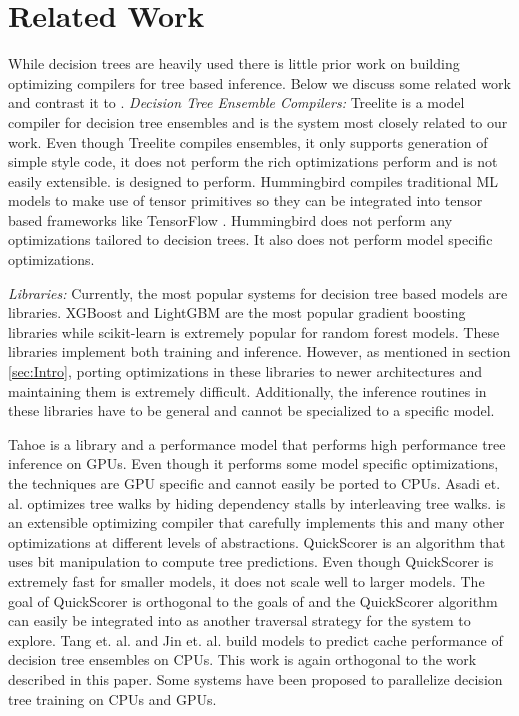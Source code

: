 \section{Related Work}
While decision trees are heavily used there is little prior work on building optimizing compilers for tree based inference. Below we discuss some related work and contrast it to \Treebeard{}.
\emph{Decision Tree Ensemble Compilers:}
Treelite\cite{Treelite} is a model compiler for decision tree ensembles and is the system
 most closely related to our work. Even though Treelite compiles ensembles, it only supports 
generation of simple  style code, it does not perform the rich 
optimizations \Treebeard{} perform and is not easily extensible.
\Treebeard{} is designed to perform. 
Hummingbird\cite{Hummingbird} compiles traditional ML models to make use 
of tensor primitives so 
they can be integrated into tensor based frameworks like TensorFlow \cite{TensorFlow}.
Hummingbird does not perform any optimizations tailored to decision trees. It 
also does not perform model specific optimizations. 

\emph{Libraries:} Currently, the most popular systems for decision tree based models 
are libraries. XGBoost\cite{XGBoost} and LightGBM\cite{LightGBM} are the most  
popular gradient boosting libraries while scikit-learn\cite{Sklearn} is 
extremely popular for random forest models. These libraries implement both 
training and inference. However, as mentioned in section \ref{sec:Intro}, porting 
optimizations in these libraries to newer architectures and maintaining them is 
extremely difficult. Additionally, the inference routines in these libraries have 
to be general and cannot be specialized to a specific model.

Tahoe\cite{Tahoe} is a library and a performance model that performs high 
performance tree inference on GPUs. Even though it performs some model 
specific optimizations, the techniques are GPU specific and cannot easily 
be ported to CPUs. Asadi et. al.\cite{VPred} optimizes tree walks
by hiding dependency stalls by interleaving tree walks. \Treebeard{} is an extensible optimizing compiler that carefully implements this and many other optimizations at different levels of abstractions.
QuickScorer\cite{QuickScorer, QuickScorer1} is an algorithm that uses 
bit manipulation to compute tree predictions. Even though QuickScorer is 
extremely fast for smaller models, it does not scale well to larger 
models\cite{ProbBasedLayout}. The goal of QuickScorer is orthogonal 
to the goals of \Treebeard{} and the QuickScorer algorithm can easily  
be integrated into \Treebeard{} as another traversal strategy for the 
system to explore. Tang et. al.\cite{CacheConscious1} and Jin et. al.\cite{CacheConscious2}
build models to predict cache performance of decision tree ensembles on CPUs.
This work is again orthogonal to the work described in this paper. Some systems have been proposed 
to parallelize decision tree training on CPUs and GPUs\cite{Jansson2014gpuRFAG, Nasridinov2013DecisionTC}.


